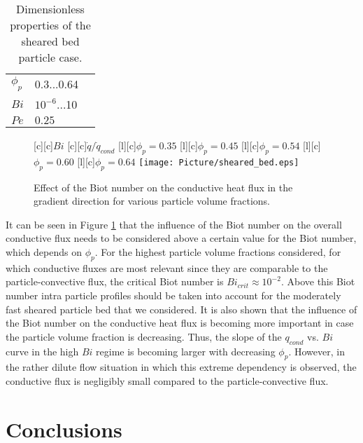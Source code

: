 \documentclass{particles2015}
\begin{document}
\begin{table}[h]
  \centering 
  \caption{Dimensionless properties of the sheared bed particle case.}
   \begin{tabular}{llr}
      \hline 
        $\phi_p$				& 0.3...0.64 &\\
        $Bi$					& $10^{-6}$...10 & \\
        $Pe$ 					& $0.25$& \\
      \hline      
       \end{tabular}
   \setlength{\belowcaptionskip}{12pt}
   \label{tab:properties_sheard_bed}
\end{table}


\begin{figure}[h!]
   \centering
	[c]{$Bi$}
   	[c][c]{$\dot{q}/\dot{q}_{cond}$}
   	[l][c]{\scriptsize{$\phi_p = 0.35$}}
   	[l][c]{\scriptsize{$\phi_p = 0.45$}}
   	[l][c]{\scriptsize{$\phi_p = 0.54$}}
   	[l][c]{\scriptsize{$\phi_p = 0.60$}}
   	[l][c]{\scriptsize{$\phi_p = 0.64$}}
   \texttt{[image: Picture/sheared\_bed.eps]}
   \caption{Effect of the Biot number on the conductive heat flux in the gradient direction for various particle volume fractions.}
   \label{fig:sheared_bed}
\end{figure}

It can be seen in Figure \ref{fig:sheared_bed} that the influence of the Biot number on the overall conductive flux needs to be considered above a certain value for the Biot number, which depends on $\phi_p$. For the highest particle volume fractions considered, for which conductive fluxes are most relevant since they are comparable to the particle-convective flux, the critical Biot number is $Bi_{crit} \approx 10^{-2}$. Above this Biot number intra particle profiles should be taken into account for the moderately fast sheared particle bed that we considered. It is also shown that the influence of the Biot number on the conductive heat flux is becoming more important in case the particle volume fraction is decreasing. Thus, the slope of the $q_{cond}$ vs. $Bi$ curve in the high $Bi$ regime is becoming larger with decreasing $\phi_p$. However, in the rather dilute flow situation in which this extreme dependency is observed, the conductive flux is negligibly small compared to the particle-convective flux. 


\section{Conclusions}
\label{sec:conclusions}
\end{document}
